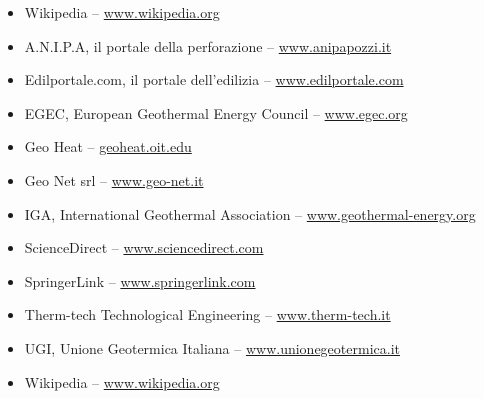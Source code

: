 \begin{itemize}
	\item Wikipedia -- \url{www.wikipedia.org}
		\item A.N.I.P.A, il portale della perforazione	-- \url{www.anipapozzi.it}
	\item Edilportale.com, il portale dell'edilizia -- \url{www.edilportale.com}
	\item EGEC, European Geothermal Energy Council -- \url{www.egec.org}
	\item Geo Heat -- \url{geoheat.oit.edu}
	\item Geo Net srl -- \url{www.geo-net.it}
	\item IGA, International Geothermal Association -- \url{www.geothermal-energy.org}
	\item ScienceDirect -- \url{www.sciencedirect.com}
	\item SpringerLink -- \url{www.springerlink.com}
	\item Therm-tech Technological Engineering -- \url{www.therm-tech.it}
	\item UGI, Unione Geotermica Italiana -- \url{www.unionegeotermica.it}
	\item Wikipedia -- \url{www.wikipedia.org}
\end{itemize}




